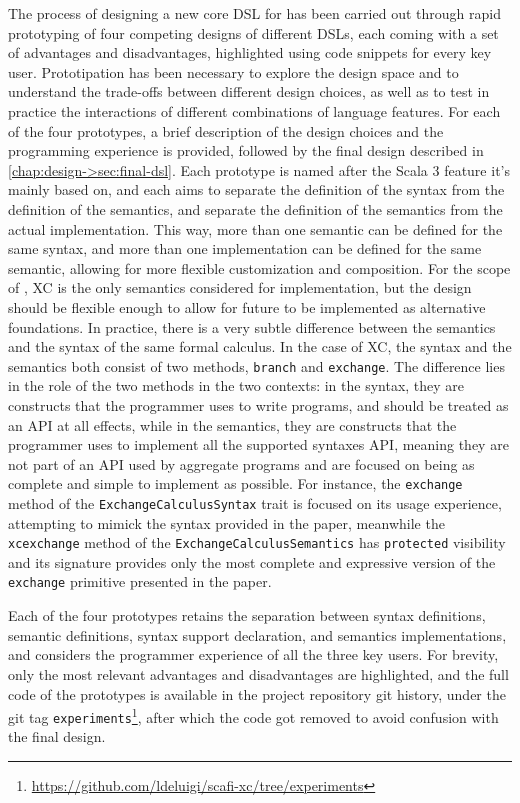 The process of designing a new core \ac{DSL} for \this has been carried out through rapid prototyping of four competing designs of different \acp{DSL}, each coming with a set of advantages and disadvantages, highlighted using code snippets for every key user.
%
Prototipation has been necessary to explore the design space and to understand the trade-offs between different design choices, as well as to test in practice the interactions of different combinations of language features.
%
For each of the four prototypes, a brief description of the design choices and the programming experience is provided, followed by the final design described in \cref{chap:design->sec:final-dsl}.
%
Each prototype is named after the Scala 3 feature it's mainly based on, and each aims to separate the definition of the syntax from the definition of the semantics, and separate the definition of the semantics from the actual implementation.
%
This way, more than one semantic can be defined for the same syntax, and more than one implementation can be defined for the same semantic, allowing for more flexible customization and composition.
%
For the scope of \this, \ac{XC}\cite{xc} is the only semantics considered for implementation, but the design should be flexible enough to allow for future  to be implemented as alternative foundations.
%
In practice, there is a very subtle difference between the semantics and the syntax of the same formal calculus.
%
In the case of \ac{XC}, the syntax and the semantics both consist of two methods, \texttt{branch} and \texttt{exchange}.
%
The difference lies in the role of the two methods in the two contexts: in the syntax, they are constructs that the programmer uses to write programs, and should be treated as an \ac{API} at all effects, while in the semantics, they are constructs that the programmer uses to implement all the supported syntaxes \ac{API}, meaning they are not part of an \ac{API} used by aggregate programs and are focused on being as complete and simple to implement as possible.
%
For instance, the \texttt{exchange} method of the \texttt{ExchangeCalculusSyntax} trait is focused on its usage experience, attempting to mimick the syntax provided in the paper, meanwhile the \texttt{xcexchange} method of the \texttt{ExchangeCalculusSemantics} has \texttt{protected} visibility and its signature provides only the most complete and expressive version of the \texttt{exchange} primitive presented in the paper\cite{xc}.

Each of the four prototypes retains the separation between syntax definitions, semantic definitions, syntax support declaration, and semantics implementations, and considers the programmer experience of all the three key users.
%
For brevity, only the most relevant advantages and disadvantages are highlighted, and the full code of the prototypes is available in the project repository git history, under the git tag \texttt{experiments}\footnote{\url{https://github.com/ldeluigi/scafi-xc/tree/experiments}}, after which the code got removed to avoid confusion with the final design.


